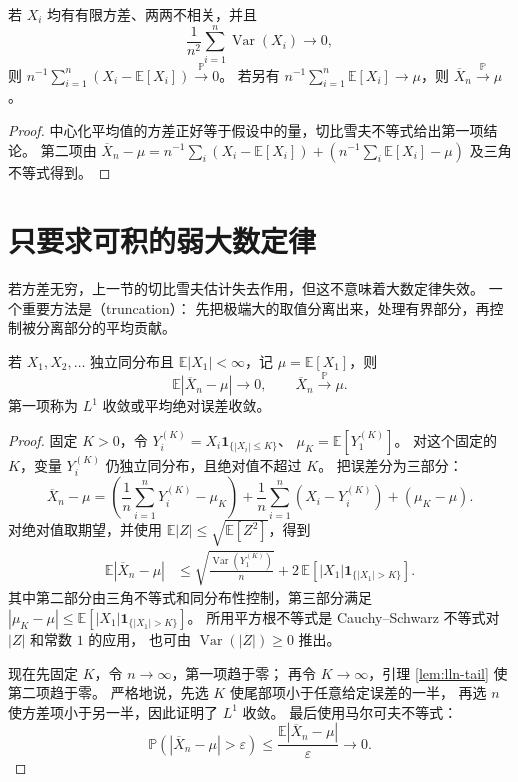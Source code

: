 \documentclass[UTF8]{ctexart}
\begin{document}
\begin{proposition}[一个更一般的方差判据]
\label{prop:lln-variance-criterion}
若 $X_i$ 均有有限方差、两两不相关，并且
\[
  \frac1{n^2}\sum_{i=1}^n\operatorname{Var}(X_i)\longrightarrow0,
\]
则
$n^{-1}\sum_{i=1}^n(X_i-\mathbb E[X_i])\xrightarrow{\mathbb P}0$。
若另有 $n^{-1}\sum_{i=1}^n\mathbb E[X_i]\to\mu$，则 $\overline X_n\xrightarrow{\mathbb P}\mu$。
\end{proposition}

\begin{proof}
中心化平均值的方差正好等于假设中的量，切比雪夫不等式给出第一项结论。
第二项由
$\overline X_n-\mu=n^{-1}\sum_i(X_i-\mathbb E[X_i])
+(n^{-1}\sum_i\mathbb E[X_i]-\mu)$
及三角不等式得到。
\end{proof}

\section{只要求可积的弱大数定律}
\label{sec:lln-weak-integrable}

若方差无穷，上一节的切比雪夫估计失去作用，但这不意味着大数定律失效。
一个重要方法是（truncation）：
先把极端大的取值分离出来，处理有界部分，再控制被分离部分的平均贡献。

\begin{theorem}[可积独立同分布变量的平均收敛]
\label{thm:lln-wlln-integrable}
若 $X_1,X_2,\ldots$ 独立同分布且 $\mathbb E|X_1|<\infty$，记
$\mu=\mathbb E[X_1]$，则
\begin{equation}
  \mathbb E|\overline X_n-\mu|\longrightarrow0,
  \qquad
  \overline X_n\xrightarrow{\mathbb P}\mu.
  \label{eq:lln-l1-convergence}
\end{equation}
第一项称为 $L^1$ 收敛或平均绝对误差收敛。
\end{theorem}

\begin{proof}
固定 $K>0$，令
$Y_i^{(K)}=X_i\mathbf1_{\{|X_i|\leq K\}}$、
$\mu_K=\mathbb E[Y_1^{(K)}]$。
对这个固定的 $K$，变量 $Y_i^{(K)}$ 仍独立同分布，且绝对值不超过 $K$。
把误差分为三部分：
\[
  \overline X_n-\mu
  =\left(\frac1n\sum_{i=1}^nY_i^{(K)}-\mu_K\right)
   +\frac1n\sum_{i=1}^n(X_i-Y_i^{(K)})
   +(\mu_K-\mu).
\]
对绝对值取期望，并使用
$\mathbb E|Z|\leq\sqrt{\mathbb E[Z^2]}$，得到
\begin{align}
  \mathbb E|\overline X_n-\mu|
  &\leq
  \sqrt{\frac{\operatorname{Var}(Y_1^{(K)})}{n}}
  +2\,\mathbb E[|X_1|\mathbf1_{\{|X_1|>K\}}].
  \label{eq:lln-truncation-l1-bound}
\end{align}
其中第二部分由三角不等式和同分布性控制，第三部分满足
$|\mu_K-\mu|\leq\mathbb E[|X_1|\mathbf1_{\{|X_1|>K\}}]$。
所用平方根不等式是 Cauchy--Schwarz 不等式对 $|Z|$ 和常数 $1$ 的应用，
也可由 $\operatorname{Var}(|Z|)\geq0$ 推出。

现在先固定 $K$，令 $n\to\infty$，第一项趋于零；
再令 $K\to\infty$，引理 \ref{lem:lln-tail} 使第二项趋于零。
严格地说，先选 $K$ 使尾部项小于任意给定误差的一半，
再选 $n$ 使方差项小于另一半，因此证明了 $L^1$ 收敛。
最后使用马尔可夫不等式：
\[
  \mathbb P(|\overline X_n-\mu|>\varepsilon)
  \leq\frac{\mathbb E|\overline X_n-\mu|}{\varepsilon}
  \longrightarrow0.
\]
\end{proof}
\end{document}
